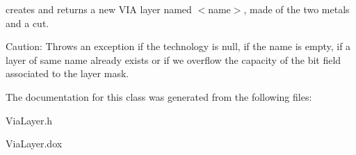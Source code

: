 creates and returns a new V\+IA layer named {\ttfamily $<$name$>$}, made of the two metals and a cut.

\begin{DoxyParagraph}{Caution\+:}
Throws an exception if the technology is null, if the name is empty, if a layer of same name already exists or if we overflow the capacity of the bit field associated to the layer mask. 
\end{DoxyParagraph}


The documentation for this class was generated from the following files\+:\begin{DoxyCompactItemize}
\item 
Via\+Layer.\+h\item 
Via\+Layer.\+dox\end{DoxyCompactItemize}
